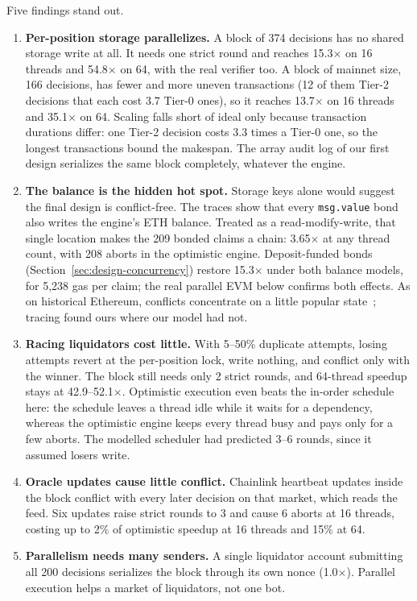 \documentclass[sigconf,nonacm]{acmart}
\newcommand{\code}[1]{\texttt{\smaller #1}}
\begin{document}
Five findings stand out.
\begin{enumerate}
  \item \textbf{Per-position storage parallelizes.} A block of 374 decisions has no shared storage write at all. It needs one strict round and reaches 15.3$\times$ on 16 threads and 54.8$\times$ on 64, with the real verifier too. A block of mainnet size, 166 decisions, has fewer and more uneven transactions (12 of them Tier-2 decisions that each cost 3.7 Tier-0 ones), so it reaches 13.7$\times$ on 16 threads and 35.1$\times$ on 64. Scaling falls short of ideal only because transaction durations differ: one Tier-2 decision costs 3.3 times a Tier-0 one, so the longest transactions bound the makespan. The array audit log of our first design serializes the same block completely, whatever the engine.
  \item \textbf{The balance is the hidden hot spot.} Storage keys alone would suggest the final design is conflict-free. The traces show that every \code{msg.value} bond also writes the engine's ETH balance. Treated as a read-modify-write, that single location makes the 209 bonded claims a chain: 3.65$\times$ at any thread count, with 208 aborts in the optimistic engine. Deposit-funded bonds (Section~\ref{sec:design-concurrency}) restore 15.3$\times$ under both balance models, for 5,238 gas per claim; the real parallel EVM below confirms both effects. As on historical Ethereum, conflicts concentrate on a little popular state~\cite{saraph2020empirical}; tracing found ours where our model had not.
  \item \textbf{Racing liquidators cost little.} With 5--50\% duplicate attempts, losing attempts revert at the per-position lock, write nothing, and conflict only with the winner. The block still needs only 2 strict rounds, and 64-thread speedup stays at 42.9--52.1$\times$. Optimistic execution even beats the in-order schedule here: the schedule leaves a thread idle while it waits for a dependency, whereas the optimistic engine keeps every thread busy and pays only for a few aborts. The modelled scheduler had predicted 3--6 rounds, since it assumed losers write.
  \item \textbf{Oracle updates cause little conflict.} Chainlink heartbeat updates inside the block conflict with every later decision on that market, which reads the feed. Six updates raise strict rounds to 3 and cause 6 aborts at 16 threads, costing up to 2\% of optimistic speedup at 16 threads and 15\% at 64.
  \item \textbf{Parallelism needs many senders.} A single liquidator account submitting all 200 decisions serializes the block through its own nonce (1.0$\times$). Parallel execution helps a market of liquidators, not one bot.
\end{enumerate}
\end{document}
